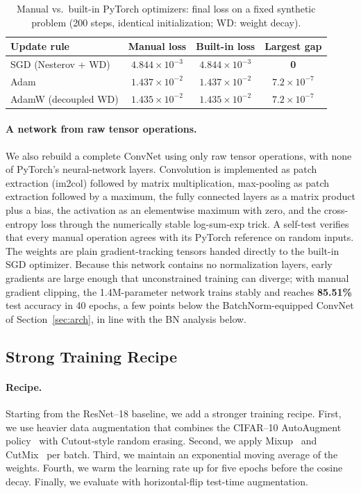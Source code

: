 \documentclass[11pt]{article}
\newcommand{\manualNetAcc}{85.51} %
\begin{document}
\begin{table}[htbp]
\centering
\caption{Manual vs.\ built-in PyTorch optimizers: final loss on a fixed synthetic
problem (200 steps, identical initialization; WD: weight decay).}
\label{tab:optval}
\begin{tabular}{lccc}
\toprule
Update rule & Manual loss & Built-in loss & Largest gap \\
\midrule
SGD (Nesterov + WD) & $4.844\times10^{-3}$ & $4.844\times10^{-3}$ & \textbf{0} \\
Adam                & $1.437\times10^{-2}$ & $1.437\times10^{-2}$ & $7.2\times10^{-7}$ \\
AdamW (decoupled WD) & $1.435\times10^{-2}$ & $1.435\times10^{-2}$ & $7.2\times10^{-7}$ \\
\bottomrule
\end{tabular}
\end{table}

\paragraph{A network from raw tensor operations.}
We also rebuild a complete ConvNet using only raw tensor operations, with none
of PyTorch's neural-network layers. Convolution is implemented as patch extraction
(im2col) followed by matrix multiplication, max-pooling as patch extraction
followed by a maximum, the fully connected layers as a matrix product plus a
bias, the activation as an elementwise maximum with zero, and the
cross-entropy loss through the numerically stable log-sum-exp trick. A
self-test verifies that every manual operation agrees with its
PyTorch reference on random inputs. The weights are plain gradient-tracking
tensors handed directly to the built-in SGD optimizer.
Because this network contains no normalization layers, early gradients are
large enough that unconstrained training can diverge; with manual gradient
clipping, the 1.4M-parameter network trains stably and reaches
\textbf{\manualNetAcc\%} test accuracy in 40 epochs, a few points below the
BatchNorm-equipped ConvNet of Section~\ref{sec:arch}, in line with the BN
analysis below.

\subsection{Strong Training Recipe}
\label{sec:headline}

\paragraph{Recipe.} Starting from the ResNet--18 baseline, we add a stronger
training recipe. First, we use heavier data augmentation that combines the
CIFAR--10 AutoAugment policy~\citep{cubuk2019autoaugment}
with Cutout-style random erasing. Second, we apply
Mixup~\citep{zhang2018mixup} and CutMix~\citep{yun2019cutmix} per batch.
Third, we maintain an exponential moving average of the weights. Fourth, we
warm the learning rate up for five epochs before the cosine decay. Finally,
we evaluate with horizontal-flip test-time augmentation.
\end{document}
